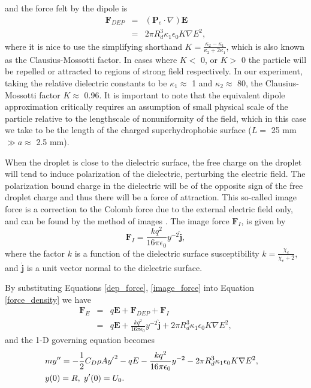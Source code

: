 \documentclass[a4paper, 12pt]{article}
\begin{document}
and the force felt by the dipole is 
\begin{eqnarray} \label{dep_force}
\mathbf{F}_{DEP} &=& \left( \mathbf{P}_e \cdot \nabla \right) \mathbf{E} \nonumber \\
&=& 2 \pi R_d^3 \kappa_1 \epsilon_0 K \nabla E^2,
\end{eqnarray}
where it is nice to use the simplifying shorthand $K = \frac{\kappa_2 - \kappa_1}{\kappa_2 + 2 \kappa_1}$, which is also known as the Clausius-Mossotti factor. In cases where $K <$ 0, or $K>$ 0 the particle will be repelled or attracted to regions of strong field respectively. In our experiment, taking the relative dielectric constants to be $\kappa_1 \approx$ 1 and $\kappa_2 \approx$ 80, the Clausius-Mossotti factor $K \approx$ 0.96. It is important to note that the equivalent dipole approximation critically requires an assumption of small physical scale of the particle relative to the lengthscale of nonuniformity of the field, which in this case we take to be the length of the charged superhydrophobic surface ($L =$ 25 mm $\gg a \approx$ 2.5 mm).

When the droplet is close to the dielectric surface, the free charge on the droplet will tend to induce polarization of the dielectric, perturbing the electric field. The polarization bound charge in the dielectric will be of the opposite sign of the free droplet charge and thus there will be a force of attraction. This so-called image force is a correction to the Colomb force due to the external electric field only, and can be found by the method of images \cite{david_j._griffiths_introduction_1999}. The image force $\mathbf{F}_I$, is given by
\begin{equation}
\mathbf{F}_I = \frac{k q^2}{16 \pi \epsilon_0} y^{-2} \hat{\mathbf{j}},
\label{image_force}
\end{equation}
where the factor $k$ is a function of the dielectric surface susceptibility $k = \frac{\chi_e}{\chi_e + 2}$, and $\hat{\mathbf{j}}$ is a unit vector normal to the dielectric surface.

By substituting Equations \ref{dep_force}, \ref{image_force} into Equation \ref{force_density} we have
\begin{eqnarray*}
 \mathbf{F}_E &=& q \mathbf{E} + \mathbf{F}_{DEP} + \mathbf{F}_I \\
 &=& q \mathbf{E} + \frac{k q^2}{16 \pi \epsilon_0 } y^{-2} \hat{\mathbf{j}} + 2 \pi R_d^3 \kappa_1 \epsilon_0 K \nabla E^2, 
\end{eqnarray*}
and the 1-D governing equation becomes
\begin{eqnarray} \label{gov_eqn_subs}
&m y'' = - \frac{1}{2} C_D \rho A {y'}^2 - q E - \frac{k q^2}{16 \pi \epsilon_0} y^{-2}- 2 \pi R_d^3 \kappa_1 \epsilon_0 K \nabla E^2,& \nonumber \\
&y(0) = R, \hspace{1 mm} y'(0) = U_0 .&
\end{eqnarray}
\end{document}
